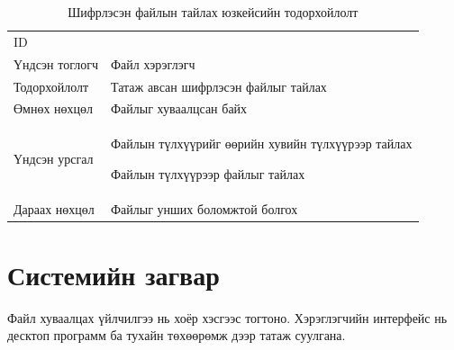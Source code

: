 \begin{table}[H]
    \footnotesize
    \centering
    \begin{tabularx}{\textwidth}{|>{\hsize=0.3\hsize}X|>{\hsize=0.7\hsize}X|}
        \hline
        \multicolumn{2}{|c|}{Шифрлэсэн файлын тайлах} \\
        \hline
        ID & 7 \\
        \hline
        Үндсэн тоглогч & Файл хэрэглэгч\\
        \hline
        Тодорхойлолт & Татаж авсан шифрлэсэн файлыг тайлах\\
        \hline
        Өмнөх нөхцөл & Файлыг хуваалцсан байх\\
        \hline
        Үндсэн урсгал & 
        \item Файлын түлхүүрийг өөрийн хувийн түлхүүрээр тайлах
        \item Файлын түлхүүрээр файлыг тайлах\\
        \hline
        Дараах нөхцөл & Файлыг унших боломжтой болгох\\
        \hline
    \end{tabularx}
    \caption{Шифрлэсэн файлын тайлах юзкейсийн тодорхойлолт}
\end{table}

\section{Системийн загвар}
Файл хуваалцах үйлчилгээ нь хоёр хэсгээс тогтоно. Хэрэглэгчийн интерфейс нь десктоп программ ба тухайн төхөөрөмж дээр татаж суулгана.

